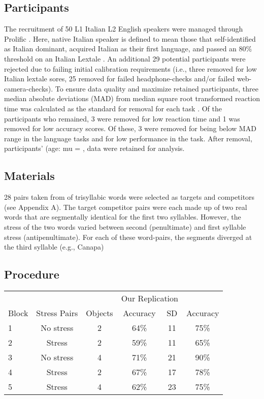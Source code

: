 
\subsection{Participants}
The recruitment of 50 L1 Italian L2 English speakers were managed through Prolific \citep{Palan_2018}. Here, native Italian speaker is defined to mean those that self-identified as Italian dominant, acquired Italian as their first language, and passed an 80\% threshold on an Italian Lextale \citep{Brown_Tusmagambet_Rahming_Tu_DeSalvo_Wiener_2023}. An additional 29 potential participants were rejected due to failing initial calibration requirements (i.e., three removed for low Italian lextale sores, 25 removed for failed headphone-checks \citep{milne_2021} and/or failed web-camera-checks). To ensure data quality and maximize retained participants, three median absolute deviations (MAD) from median square root transformed reaction time was calculated as the standard for removal for each task \citep{Leys_2013}. Of the  participants who remained,  3 were removed for low reaction time and 1 was removed for low accuracy scores. Of these, 3 were removed for being below MAD range in the language tasks and  for low performance in the task.  After removal,  participants' (age: mu = , data were retained for analysis. 

\subsection{Materials}

28 pairs taken from \cite{Sulpizio_McQueen_2012} of trisyllabic words were selected as targets and competitors (see Appendix A). The target competitor pairs were each made up of two real words that are segmentally identical for the first two syllables. However, the stress of the two words varied between second (penultimate) and first syllable stress (antipenultimate). For each of these word-pairs, the segments diverged at the third syllable (e.g., Canapa)
\subsection{Procedure}

\begin{tabular*}{\textwidth}{@{\extracolsep\fill}lccccc}
\toprule
&&& \multicolumn{2}{c}{Our Replication} & \multicolumn{1}{c}{\cite{Sulpizio_McQueen_2012}} \\ 
\cmidrule(lr){4-5} \cmidrule(lr){6-6} %
Block & Stress Pairs & Objects & Accuracy & SD & Accuracy \\
\midrule
1 & No stress & 2 & 64\% & 11 & 75\%\\ 
2 & Stress & 2  & 59\% & 11 & 65\%\\ 
3 & No stress & 4 & 71\% & 21 & 90\% \\ 
4 & Stress & 2 & 67\% & 17 & 78\%\\ 
5 & Stress &  4 & 62\% & 23 & 75\%\\ 
\bottomrule
\end{tabular*}



